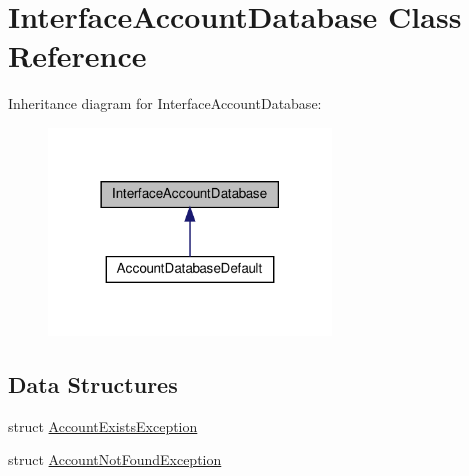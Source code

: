 \hypertarget{classInterfaceAccountDatabase}{}\section{Interface\+Account\+Database Class Reference}
\label{classInterfaceAccountDatabase}


Inheritance diagram for Interface\+Account\+Database\+:\nopagebreak
\begin{figure}[H]
\begin{center}
\leavevmode
\includegraphics[width=213pt]{d0/dcd/classInterfaceAccountDatabase__inherit__graph}
\end{center}
\end{figure}
\subsection*{Data Structures}
\begin{DoxyCompactItemize}
\item 
struct \hyperlink{structInterfaceAccountDatabase_1_1AccountExistsException}{Account\+Exists\+Exception}
\item 
struct \hyperlink{structInterfaceAccountDatabase_1_1AccountNotFoundException}{Account\+Not\+Found\+Exception}
\end{DoxyCompactItemize}
